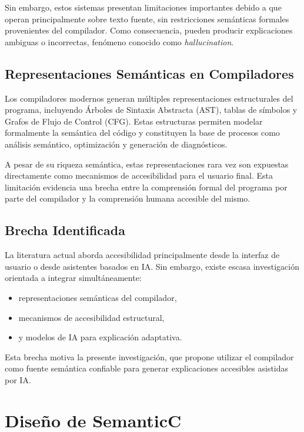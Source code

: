 \documentclass[conference]{IEEEtran}
\begin{document}
Sin embargo, estos sistemas presentan limitaciones importantes debido a que operan principalmente sobre texto fuente, sin restricciones semánticas formales provenientes del compilador. Como consecuencia, pueden producir explicaciones ambiguas o incorrectas, fenómeno conocido como \textit{hallucination}.

\subsection{Representaciones Semánticas en Compiladores}

Los compiladores modernos generan múltiples representaciones estructurales del programa, incluyendo Árboles de Sintaxis Abstracta (AST), tablas de símbolos y Grafos de Flujo de Control (CFG). Estas estructuras permiten modelar formalmente la semántica del código y constituyen la base de procesos como análisis semántico, optimización y generación de diagnósticos.

A pesar de su riqueza semántica, estas representaciones rara vez son expuestas directamente como mecanismos de accesibilidad para el usuario final. Esta limitación evidencia una brecha entre la comprensión formal del programa por parte del compilador y la comprensión humana accesible del mismo.

\subsection{Brecha Identificada}

La literatura actual aborda accesibilidad principalmente desde la interfaz de usuario o desde asistentes basados en IA. Sin embargo, existe escasa investigación orientada a integrar simultáneamente:

\begin{itemize}
    \item representaciones semánticas del compilador,
    \item mecanismos de accesibilidad estructural,
    \item y modelos de IA para explicación adaptativa.
\end{itemize}

Esta brecha motiva la presente investigación, que propone utilizar el compilador como fuente semántica confiable para generar explicaciones accesibles asistidas por IA.


\section{Diseño de SemanticC}
\end{document}
